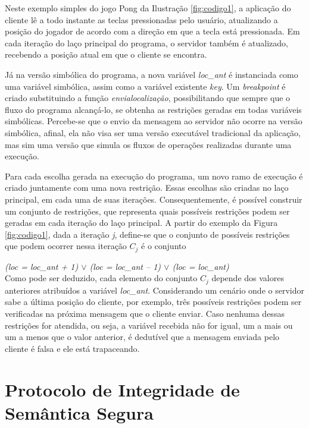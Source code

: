 Neste exemplo simples do jogo Pong \cite{pong} da Ilustração \ref{fig:codigo1}, a aplicação do cliente lê a todo instante as teclas pressionadas pelo usuário, atualizando a posição do jogador de acordo com a direção em que a tecla está pressionada. Em cada iteração do laço principal do programa, o servidor também é atualizado, recebendo a posição atual em que o cliente se encontra. 

Já na versão simbólica do programa, a nova variável \textit{loc\_ant} é instanciada como uma variável simbólica, assim como a variável existente \textit{key}. Um \textit{breakpoint} é criado substituindo a função \textit{envialocalização}, possibilitando que sempre que o fluxo do programa alcançá-lo, se obtenha as restrições geradas em todas variáveis simbólicas. Percebe-se que o envio da mensagem ao servidor não ocorre na versão simbólica, afinal, ela não visa ser uma versão executável tradicional da aplicação, mas sim uma versão que simula os fluxos de operações realizadas durante uma execução.


Para cada escolha gerada na execução do programa, um novo ramo de execução é criado juntamente com uma nova restrição. Essas escolhas são criadas no laço principal, em cada uma de suas iterações. Consequentemente, é possível construir um conjunto de restrições, que representa quais possíveis restrições podem ser geradas em cada iteração do laço principal. 
A partir do exemplo da Figura \ref{fig:codigo1}, dada a iteração \textit{j}, define-se que o conjunto de possíveis restrições que podem ocorrer nessa iteração $C_j$ é o conjunto

\textit{(loc = loc\_ant + 1) $\vee$  (loc = loc\_ant -- 1) $\vee$ (loc = loc\_ant) } \\

Como pode ser deduzido, cada elemento do conjunto $C_j$ depende dos valores anteriores atribuídos a variável \textit{loc\_ant}. Considerando um cenário onde o servidor sabe a última posição do cliente, por exemplo, três possíveis restrições podem ser verificadas na próxima mensagem que o cliente enviar. Caso nenhuma dessas restrições for atendida, ou seja, a variável recebida não for igual, um a mais ou um a menos que o valor anterior, é dedutível que a mensagem enviada pelo cliente é falsa e ele está trapaceando.


\section{Protocolo de Integridade de Semântica Segura}
\label{semantics}

